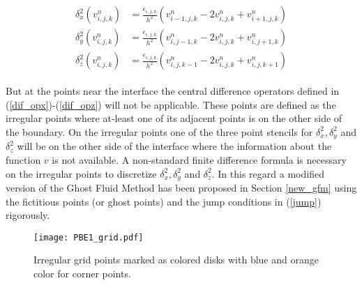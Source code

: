  \begin{eqnarray}
 \begin{aligned}
	\delta_x^2\left(v_{i,j,k}^n\right)&= \frac{\epsilon_{i,j,k}}{h^2} \left(v_{i-1,j,k}^n-2v_{i,j,k}^n+v_{i+1,j,k}^n\right) \\ \label{dif_opx}
	\delta_y^2\left(v_{i,j,k}^n\right)&= \frac{\epsilon_{i,j,k}}{h^2} \left(v_{i,j-1,k}^n-2v_{i,j,k}^n+v_{i,j+1,k}^n\right)\\ %
	\delta_z^2\left(v_{i,j,k}^n\right)&= \frac{\epsilon_{i,j,k}}{h^2} \left(v_{i,j,k-1}^n-2v_{i,j,k}^n+v_{i,j,k+1}^n\right) \label{dif_opz}
\end{aligned}
\end{eqnarray}

But at the  points near the interface the central difference operators defined in (\ref{dif_opx})-(\ref{dif_opz}) will not be applicable. These points are defined as the irregular points where at-least one of its adjacent points is on the other side of the boundary. On the irregular points one of the three point stencils for $\delta_x^2,\delta_y^2$ and $\delta_z^2$  will be on the other side of the interface where the information about the function $v$ is not available. A non-standard finite difference formula is necessary on the irregular points to discretize $\delta_x^2,\delta_y^2$ and $\delta_z^2$.  In this regard a modified version of the Ghost Fluid Method has been proposed in Section \ref{new_gfm} using the fictitious points (or ghost points) and the jump conditions in (\ref{jump}) rigorously.

\begin{figure}[!ht]
	\centering
	\texttt{[image: PBE1\_grid.pdf]}
	\caption{Irregular grid points marked as colored disks with blue and orange color for corner points.}
	\label{fig_irgpoints}
\end{figure}


